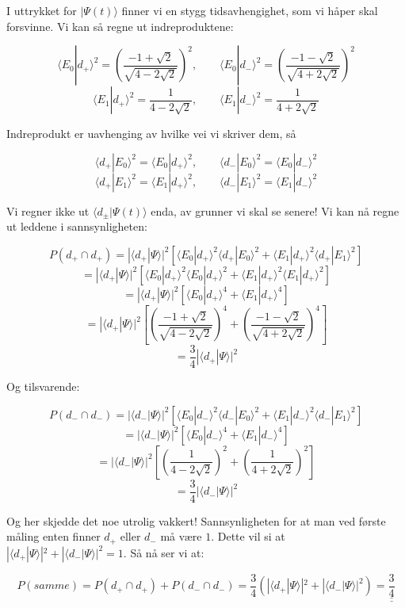 \documentclass[a4paper,norsk, 10pt]{article}
\numberwithin{equation}{section}
\begin{document}
I uttrykket for $|\Psi(t)\rangle$ finner vi en stygg tidsavhengighet, som vi håper skal forsvinne. Vi kan så regne ut indreproduktene:

$$
\langle E_0|d_+\rangle^2 = \left(\frac{-1 + \sqrt{2}}{\sqrt{4-2\sqrt{2}}}\right)^2, \qquad \langle E_0|d_-\rangle^2 = \left(\frac{-1 - \sqrt{2}}{\sqrt{4+2\sqrt{2}}}\right)^2
$$
$$
\langle E_1|d_+\rangle^2 = \frac{1}{4-2\sqrt{2}} ,\qquad \langle E_1|d_-\rangle^2 = \frac{1}{4+2\sqrt{2}} 
$$

Indreprodukt er uavhenging av hvilke vei vi skriver dem, så

$$
\langle d_+|E_0\rangle^2 = \langle E_0|d_+\rangle^2 ,\qquad \langle d_-|E_0\rangle^2 = \langle E_0|d_-\rangle^2
$$
$$
\langle d_+|E_1\rangle^2 = \langle E_1|d_+\rangle^2 ,\qquad \langle d_-|E_1\rangle^2 = \langle E_1|d_-\rangle^2
$$

Vi regner ikke ut $\langle d_{\pm}|\Psi(t)\rangle$ enda, av grunner vi skal se senere! Vi kan nå regne ut leddene i sannsynligheten:

$$
P(d_+ \cap d_+) = |\langle d_+|\Psi\rangle|^2\left[\langle E_0|d_+\rangle^2\langle d_+|E_0\rangle^2 + \langle E_1|d_+\rangle^2\langle d_+|E_1\rangle^2\right]
$$
$$
= |\langle d_+|\Psi\rangle|^2\left[\langle E_0|d_+\rangle^2\langle E_0|d_+\rangle^2 + \langle E_1|d_+\rangle^2\langle E_1|d_+\rangle^2\right]
$$
$$
= |\langle d_+|\Psi\rangle|^2\left[\langle E_0|d_+\rangle^4 + \langle E_1|d_+\rangle^4\right]
$$
$$
= |\langle d_+|\Psi\rangle|^2\left[\left(\frac{-1+\sqrt{2}}{\sqrt{4-2\sqrt{2}}}\right)^4 + \left(\frac{-1-\sqrt{2}}{\sqrt{4+2\sqrt{2}}}\right)^4\right]
$$
$$
= \frac{3}{4}|\langle d_+|\Psi\rangle|^2
$$

Og tilsvarende:

$$
P(d_- \cap d_-) = |\langle d_-|\Psi\rangle|^2\left[\langle E_0|d_-\rangle^2\langle d_-|E_0\rangle^2 + \langle E_1|d_-\rangle^2\langle d_-|E_1\rangle^2\right]
$$
$$
= |\langle d_-|\Psi\rangle|^2\left[\langle E_0|d_-\rangle^4 + \langle E_1|d_-\rangle^4\right]
$$
$$
= |\langle d_-|\Psi\rangle|^2\left[ \left(\frac{1}{4-2\sqrt{2}}\right)^2 + \left(\frac{1}{4+2\sqrt{2}}\right)^2\right]
$$
$$
= \frac{3}{4}|\langle d_-|\Psi\rangle|^2
$$

Og her skjedde det noe utrolig vakkert! Sannsynligheten for at man ved første måling enten finner $d_+$ eller $d_-$ må være $1$. Dette vil si at $|\langle d_+|\Psi\rangle|^2 + |\langle d_-|\Psi\rangle|^2 = 1$. Så nå ser vi at:

\begin{equation}
P(samme) = P(d_+ \cap d_+) + P(d_- \cap d_-) = \frac{3}{4}\left(|\langle d_+|\Psi\rangle|^2 + |\langle d_-|\Psi\rangle|^2\right) = \underline{\underline{\frac{3}{4}}}
\end{equation}
\end{document}
